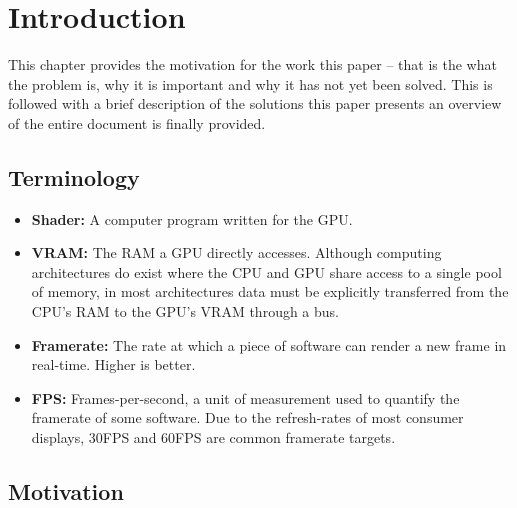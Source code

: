 \documentclass[a4paper,12pt,twoside,openright]{report}
\begin{document}
\pagestyle{empty}
\singlespacing

\onehalfspacing

\singlespacing


\setcounter{page}{0}
\pagestyle{plain}
\tableofcontents

\onehalfspacing


\chapter{Introduction}
\setcounter{page}{1}

This chapter provides the motivation for the work this paper -- that is the
what the problem is, why it is important and why it has not yet been solved.
This is followed with a brief description of the solutions this paper presents
an overview of the entire document is finally provided.

\section{Terminology}

\begin{itemize}

    \item \textbf{Shader:} A computer program written for the GPU.

    \item \textbf{VRAM:} The RAM a GPU directly accesses. Although computing
    architectures do exist where the CPU and GPU share access to a single pool
    of memory, in most architectures data must be explicitly transferred from
    the CPU's RAM to the GPU's VRAM through a bus.

    \item \textbf{Framerate:} The rate at which a piece of software can render
    a new frame in real-time. Higher is better.

    \item \textbf{FPS:} Frames-per-second, a unit of measurement used to
    quantify the framerate of some software. Due to the refresh-rates of most
    consumer displays, 30FPS and 60FPS are common framerate targets.

\end{itemize}

\section{Motivation}
\end{document}
